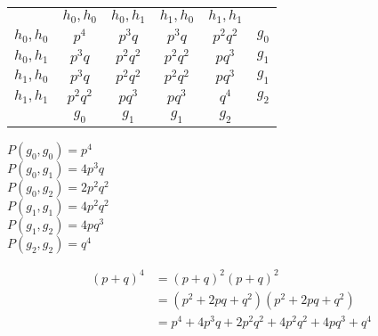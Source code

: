 \hfill \break
\begin{minipage}{0.65\textwidth}
\begin{tabular}[t]{c|c|c|c|c|c}
\multicolumn{1}{c}{\rule[-1.5ex]{0pt}{0pt}} &
\multicolumn{1}{c}{$h_{0}, h_{0}$} &
\multicolumn{1}{c}{$h_{0}, h_{1}$} &
\multicolumn{1}{c}{$h_{1}, h_{0}$} &
\multicolumn{1}{c}{$h_{1}, h_{1}$} &
\multicolumn{1}{c}{} \\ \cline{2-5}
\rule{0pt}{3ex}\rule[-1.5ex]{0pt}{0pt}
  $h_{0}, h_{0}$    &  $p^{4}$       &  $p^{3}q$      &  $p^{3}q$      &  $p^{2}q^{2}$  &    $g_{0}$  \\ \cline{2-5}
\rule{0pt}{3ex}\rule[-1.5ex]{0pt}{0pt}
  $h_{0}, h_{1}$    &  $p^{3}q$      &  $p^{2}q^{2}$  &  $p^{2}q^{2}$  &  $pq^{3}$      &    $g_{1}$  \\ \cline{2-5}
\rule{0pt}{3ex}\rule[-1.5ex]{0pt}{0pt}
  $h_{1}, h_{0}$    &  $p^{3}q$      &  $p^{2}q^{2}$  &  $p^{2}q^{2}$  &  $pq^{3}$      &    $g_{1}$  \\ \cline{2-5}
\rule{0pt}{3ex}\rule[-1.5ex]{0pt}{0pt}
  $h_{1}, h_{1}$    &  $p^{2}q^{2}$  &  $pq^{3}$      &  $pq^{3}$      &  $q^{4}$       &    $g_{2}$  \\ \cline{2-5}
\multicolumn{1}{c}{} &
\multicolumn{1}{c}{$g_{0}$} &
\multicolumn{1}{c}{$g_{1}$} &
\multicolumn{1}{c}{$g_{1}$} &
\multicolumn{1}{c}{$g_{2}$} &
\multicolumn{1}{c}{}
\end{tabular}
\end{minipage}
\begin{minipage}{0.35\textwidth}
\begin{flushleft}
$P(g_{0}, g_{0}) = p^{4} $        \\[1.5ex]
$P(g_{0}, g_{1}) = 4p^{3}q $      \\[1.5ex]
$P(g_{0}, g_{2}) = 2p^{2}q^{2} $  \\[1.5ex]
$P(g_{1}, g_{1}) = 4p^{2}q^{2} $  \\[1.5ex]
$P(g_{1}, g_{2}) = 4pq^{3} $      \\[1.5ex]
$P(g_{2}, g_{2}) = q^{4} $
\end{flushleft}
\end{minipage}

\[
\begin{split}
	(p+q)^{4}	& = (p+q)^{2} (p+q)^{2} \\
  	& = (p^2 + 2pq + q^2) (p^2 + 2pq + q^2) \\
  	& = p^{4} + 4p^{3}q + 2p^{2}q^{2} + 4p^{2}q^{2} + 4pq^{3} + q^{4}
\end{split}
\]


